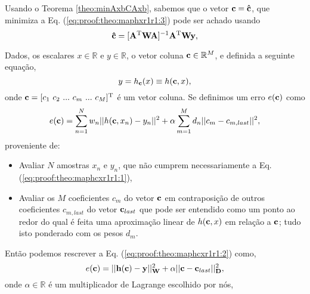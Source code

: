 \begin{myproofT}
Usando o Teorema \ref{theo:minAxbCAxb}, sabemos que o vetor $\VECTOR{c}=\VECTOR{\hat{c}}$,
que minimiza a Eq. (\ref{eq:proof:theo:maphxr1r1:3}) pode ser achado usando 
\begin{equation}\label{eq:proof:theo:maphxr1r1:5}
\VECTOR{\hat{c}}=[\MATRIX{A}^{\transpose}\MATRIX{W}\MATRIX{A}]^{-1}\MATRIX{A}^{\transpose}\MATRIX{W}\VECTOR{y},
\end{equation}
\end{myproofT}

\begin{myproofT}\label{proof:theo:maphcxr1r1}
Dados,
os escalares $x \in \mathbb{R}$ e $y \in \mathbb{R}$, o vetor coluna $\VECTOR{c} \in \mathbb{R}^M$, e 
definida a seguinte equação,
\begin{equation}\label{eq:proof:theo:maphcxr1r1:1}
y=h_{\VECTOR{c}}(x)\equiv h(\VECTOR{c},x),
\end{equation}
onde $\VECTOR{c}=[c_1~ c_2~ ...~ c_m~ ...~ c_M]^{\transpose}$ é um vetor coluna.
Se definimos um erro $e(\VECTOR{c})$ como
\begin{equation}\label{eq:proof:theo:maphcxr1r1:2}
e(\VECTOR{c}) =  \sum_{n=1}^{N} w_n||h(\VECTOR{c},x_n)-y_n||^2 + \alpha \sum_{m=1}^{M} d_n||c_m-c_{m,last}||^2,
\end{equation}
proveniente de:
\begin{itemize}
\item Avaliar $N$ amostras $x_n$ e $y_n$, que não cumprem necessariamente a Eq. (\ref{eq:proof:theo:maphcxr1r1:1}), 
\item Avaliar os $M$ coeficientes $c_m$ do vetor $\VECTOR{c}$ 
em contraposição de outros coeficientes $c_{m,last}$ do vetor $\VECTOR{c}_{last}$
que pode ser entendido como um ponto ao redor do qual é feita uma aproximação
linear de $h(\VECTOR{c},x)$ em relação a $\VECTOR{c}$; 
tudo isto ponderado com os pesos $d_m$.
\end{itemize}
Então podemos rescrever a Eq. (\ref{eq:proof:theo:maphcxr1r1:2}) como,
\begin{equation}\label{eq:proof:theo:maphcxr1r1:3}
e(\VECTOR{c}) =  ||\VECTOR{h}(\VECTOR{c})-\VECTOR{y}||_{\MATRIX{W}}^2 + \alpha||\VECTOR{c}-\VECTOR{c}_{last}||_{\MATRIX{D}}^2,
\end{equation}
onde $\alpha \in \mathbb{R}$ é um multiplicador de Lagrange escolhido por nós,
\begin{equation}

\end{equation}
\end{myproofT}
